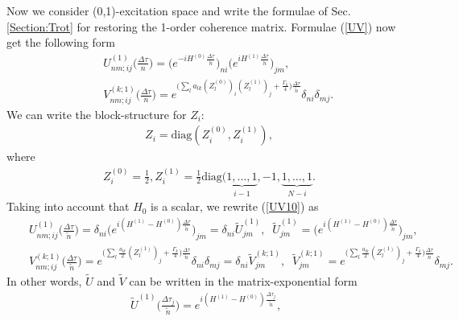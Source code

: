\documentclass[pra,preprint,showpacs]{revtex4-1}
\begin{document}
{Now we consider (0,1)-excitation space and write the formulae of Sec.\ref{Section:Trot} for restoring the 1-order coherence matrix. Formulae (\ref{UV}) now get the following form
\begin{eqnarray}\label{UV10}
&&
U^{(1)}_{nm;ij}\Big(\frac{\Delta \tau}{n}\Big) = \Big(e^{ -i H^{(0)}\frac{\Delta \tau}{\tilde n}} \Big)_{ni}\Big(e^{ i H^{(1)}\frac{\Delta \tau}{\tilde n}} \Big)_{jm}  ,\\\nonumber
&&
V^{(k;1)}_{nm;ij}\Big(\frac{\Delta \tau}{n}\Big) = e^{ \Big( \sum_l a_{lk} (Z^{(0)}_l)_{i}   (Z^{(1)}_l)_{j}  +\frac{\Gamma_k}{4}\Big)    \frac{\Delta \tau}{\tilde n}}  \delta_{ni}\delta_{mj}.
\end{eqnarray}
We can write the block-structure for $Z_i$:
\begin{eqnarray}
Z_i ={\mbox{diag}}(Z_i^{(0)}, Z_i^{(1)}),
\end{eqnarray}
where
\begin{eqnarray}
Z_i^{(0)} =\frac{1}{2}, Z_i^{(1)} = \frac{1}{2} {\mbox{diag}}( \underbrace{1,\dots,1}_{i-1}, -1, \underbrace{1,\dots,1}_{N-i}.
\end{eqnarray}
Taking into account that $H_0$ is a scalar, we rewrite (\ref{UV10}) as
\begin{eqnarray}\label{UV1}
&&
U^{(1)}_{nm;ij}\Big(\frac{\Delta \tau}{\tilde n}\Big) = \delta_{ni}\Big(e^{ i (H^{(1)}-H^{(0)})\frac{\Delta \tau}{\tilde n}} \Big)_{jm}= \delta_{ni}\tilde U^{(1)}_{jm},\;\; \tilde U^{(1)}_{jm} = \Big(e^{ i (H^{(1)}-H^{(0)})\frac{\Delta \tau}{\tilde n}} \Big)_{jm}  ,\\\nonumber
&&
V^{(k;1)}_{nm;ij}\Big(\frac{\Delta \tau}{\tilde n}\Big) = e^{ \Big( \sum_l \frac{a_{lk}}{2}    (Z^{(1)}_l)_{j}  +\frac{\Gamma_k}{4}\Big)    \frac{\Delta \tau}{\tilde n}}  \delta_{ni}\delta_{mj}  =\delta_{ni} \tilde V^{(k;1)}_{jm},\;\; \tilde V^{(k;1)}_{jm}=e^{ \Big( \sum_l \frac{a_{lk}}{2}    (Z^{(1)}_l)_{j}  +\frac{\Gamma_k}{4}\Big) \frac{\Delta \tau}{\tilde n}}\delta_{mj}.
\end{eqnarray}
In other words, $\tilde U$ and $\tilde V$ can be written in the matrix-exponential form
%
\begin{eqnarray}
\tilde U^{(1)}\Big(\frac{\Delta \tau_j}{\tilde n}\Big) = e^{ i (H^{(1)}-H^{(0)})\frac{\Delta \tau_j}{\tilde n}},\;\;

\end{eqnarray}}
\end{document}
